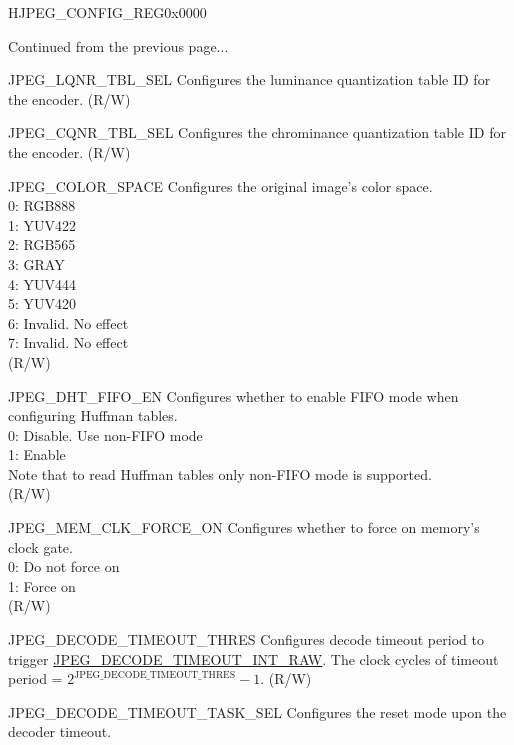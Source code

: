 \addtocounter{Regfloat}{-1}
\begin{register}{H}{JPEG\_CONFIG\_REG}{0x0000}
\begin{regdesc}\begin{reglist}
\item [Continued from the previous page...]

\label{fielddesc:JPEGLQNRTBLSEL}\item [JPEG\_LQNR\_TBL\_SEL] Configures the luminance quantization table ID for the encoder. (R/W)
\label{fielddesc:JPEGCQNRTBLSEL}\item [JPEG\_CQNR\_TBL\_SEL] Configures the chrominance quantization table ID for the encoder. (R/W)
\label{fielddesc:JPEGCOLORSPACE}\item [JPEG\_COLOR\_SPACE] Configures the original image's color space.\\
0: RGB888\\
1: YUV422\\
2: RGB565\\
3: GRAY\\
4: YUV444\\
5: YUV420\\
6: Invalid. No effect\\
7: Invalid. No effect\\
(R/W)
\label{fielddesc:JPEGDHTFIFOEN}\item [JPEG\_DHT\_FIFO\_EN] Configures whether to enable FIFO mode when configuring Huffman tables.\\
0: Disable. Use non-FIFO mode\\
1: Enable\\
Note that to read Huffman tables only non-FIFO mode is supported.\\
(R/W)
\label{fielddesc:JPEGMEMCLKFORCEON}\item [JPEG\_MEM\_CLK\_FORCE\_ON] Configures whether to force on memory's clock gate.\\
0: Do not force on\\
1: Force on\\
(R/W)
\label{fielddesc:JPEGDECODETIMEOUTTHRES}\item [JPEG\_DECODE\_TIMEOUT\_THRES] Configures decode timeout period to trigger \hyperref[fielddesc:JPEGDECODETIMEOUTINTRAW]{JPEG\_DECODE\_TIMEOUT\_INT\_RAW}. The clock cycles of timeout period = $2^{\mathrm{JPEG\_DECODE\_TIMEOUT\_THRES}} - 1$. (R/W)
\label{fielddesc:JPEGDECODETIMEOUTTASKSEL}\item [JPEG\_DECODE\_TIMEOUT\_TASK\_SEL] Configures the reset mode upon the decoder timeout.\\

\end{reglist}
\end{regdesc}
\end{register}
